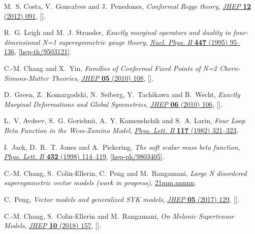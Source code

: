 \begin{thebibliography}{10}
M.~S. Costa, V.~Goncalves and J.~Penedones, \emph{{Conformal Regge theory}},
  \href{http://dx.doi.org/10.1007/JHEP12(2012)091}{\emph{JHEP} {\bfseries 12}
  (2012) 091}, [\href{https://arxiv.org/abs/1209.4355}{{}}].

R.~G. Leigh and M.~J. Strassler, \emph{{Exactly marginal operators and duality
  in four-dimensional N=1 supersymmetric gauge theory}},
  \href{http://dx.doi.org/10.1016/0550-3213(95)00261-P}{\emph{Nucl. Phys. B}
  {\bfseries 447} (1995) 95--136},
  [\href{https://arxiv.org/abs/hep-th/9503121}{{\ttfamily hep-th/9503121}}].

C.-M. Chang and X.~Yin, \emph{{Families of Conformal Fixed Points of N=2
  Chern-Simons-Matter Theories}},
  \href{http://dx.doi.org/10.1007/JHEP05(2010)108}{\emph{JHEP} {\bfseries 05}
  (2010) 108}, [\href{https://arxiv.org/abs/1002.0568}{{}}].

D.~Green, Z.~Komargodski, N.~Seiberg, Y.~Tachikawa and B.~Wecht, \emph{{Exactly
  Marginal Deformations and Global Symmetries}},
  \href{http://dx.doi.org/10.1007/JHEP06(2010)106}{\emph{JHEP} {\bfseries 06}
  (2010) 106}, [\href{https://arxiv.org/abs/1005.3546}{{}}].

L.~V. Avdeev, S.~G. Gorishnii, A.~Y. Kamenshchik and S.~A. Larin, \emph{{Four
  Loop Beta Function in the {Wess-Zumino} Model}},
  \href{http://dx.doi.org/10.1016/0370-2693(82)90727-4}{\emph{Phys. Lett. B}
  {\bfseries 117} (1982) 321--323}.

I.~Jack, D.~R.~T. Jones and A.~Pickering, \emph{{The soft scalar mass beta
  function}},
  \href{http://dx.doi.org/10.1016/S0370-2693(98)00647-9}{\emph{Phys. Lett. B}
  {\bfseries 432} (1998) 114--119},
  [\href{https://arxiv.org/abs/hep-ph/9803405}{{\ttfamily hep-ph/9803405}}].

C.-M. Chang, S.~Colin-Ellerin, C.~Peng and M.~Rangamani, \emph{{Large N
  disordered supersymmetric vector models (work in progress)}},
  \href{https://arxiv.org/abs/21mm.nnnnn}{{\ttfamily 21mm.nnnnn}}.

C.~Peng, \emph{{Vector models and generalized SYK models}},
  \href{http://dx.doi.org/10.1007/JHEP05(2017)129}{\emph{JHEP} {\bfseries 05}
  (2017) 129}, [\href{https://arxiv.org/abs/1704.04223}{{}}].

C.-M. Chang, S.~Colin-Ellerin and M.~Rangamani, \emph{{On Melonic Supertensor
  Models}}, \href{http://dx.doi.org/10.1007/JHEP10(2018)157}{\emph{JHEP}
  {\bfseries 10} (2018) 157},
  [\href{https://arxiv.org/abs/1806.09903}{{}}].


\end{thebibliography}
